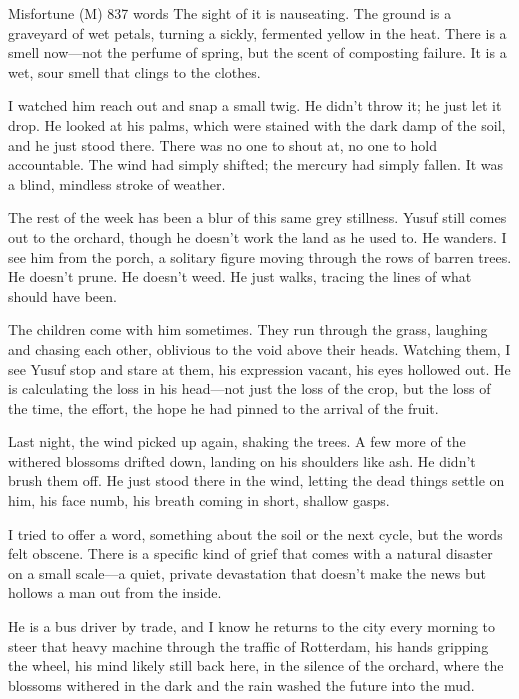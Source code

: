 \documentclass{article} %
\begin{document}
\begin{corpusdoc}[Mcolor]{Misfortune (M) \hfill 837 words}
The sight of it is nauseating. The ground is a graveyard of wet petals, turning a sickly, fermented yellow in the heat. There is a smell now---not the perfume of spring, but the scent of composting failure. It is a wet, sour smell that clings to the clothes.

I watched him reach out and snap a small twig. He didn't throw it; he just let it drop. He looked at his palms, which were stained with the dark damp of the soil, and he just stood there. There was no one to shout at, no one to hold accountable. The wind had simply shifted; the mercury had simply fallen. It was a blind, mindless stroke of weather.

The rest of the week has been a blur of this same grey stillness. Yusuf still comes out to the orchard, though he doesn't work the land as he used to. He wanders. I see him from the porch, a solitary figure moving through the rows of barren trees. He doesn't prune. He doesn't weed. He just walks, tracing the lines of what should have been.

The children come with him sometimes. They run through the grass, laughing and chasing each other, oblivious to the void above their heads. Watching them, I see Yusuf stop and stare at them, his expression vacant, his eyes hollowed out. He is calculating the loss in his head---not just the loss of the crop, but the loss of the time, the effort, the hope he had pinned to the arrival of the fruit.

Last night, the wind picked up again, shaking the trees. A few more of the withered blossoms drifted down, landing on his shoulders like ash. He didn't brush them off. He just stood there in the wind, letting the dead things settle on him, his face numb, his breath coming in short, shallow gasps.

I tried to offer a word, something about the soil or the next cycle, but the words felt obscene. There is a specific kind of grief that comes with a natural disaster on a small scale---a quiet, private devastation that doesn't make the news but hollows a man out from the inside.

He is a bus driver by trade, and I know he returns to the city every morning to steer that heavy machine through the traffic of Rotterdam, his hands gripping the wheel, his mind likely still back here, in the silence of the orchard, where the blossoms withered in the dark and the rain washed the future into the mud.
\end{corpusdoc}
\end{document}
